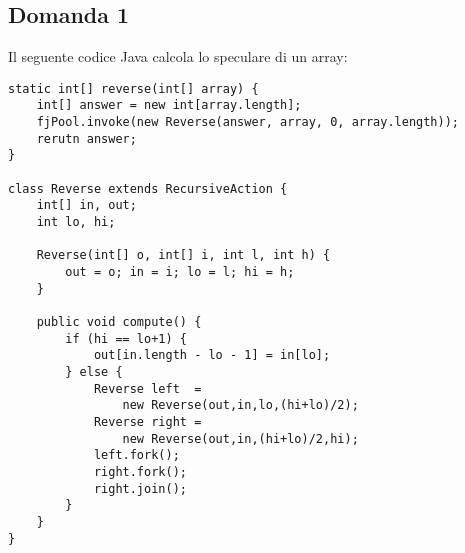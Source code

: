 \subsection{Domanda 1}
Il seguente codice Java calcola lo speculare di un array:
\begin{lstlisting}
static int[] reverse(int[] array) {
	int[] answer = new int[array.length];
	fjPool.invoke(new Reverse(answer, array, 0, array.length));
	rerutn answer;
}

class Reverse extends RecursiveAction {
	int[] in, out;
	int lo, hi;

	Reverse(int[] o, int[] i, int l, int h) {
		out = o; in = i; lo = l; hi = h;
	}

	public void compute() {
		if (hi == lo+1) {
			out[in.length - lo - 1] = in[lo];
		} else {
			Reverse left  =
				new Reverse(out,in,lo,(hi+lo)/2);
			Reverse right =
				new Reverse(out,in,(hi+lo)/2,hi);
			left.fork();
			right.fork();
			right.join();
		}
	}
}
\end{lstlisting}
